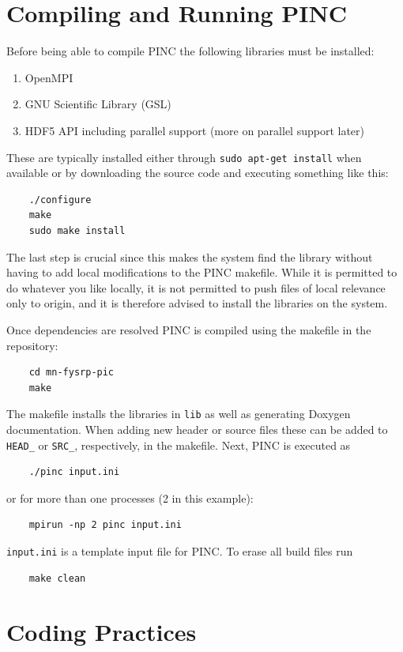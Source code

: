 \documentclass[10pt,a4paper]{article}
\begin{document}
\section{Compiling and Running PINC}\label{sec:dependencies}
Before being able to compile PINC the following libraries must be installed:
\begin{enumerate}
	\item OpenMPI
	\item GNU Scientific Library (GSL)
	\item HDF5 API including parallel support (more on parallel support later)
\end{enumerate}
These are typically installed either through \verb$sudo apt-get install$ when available or by downloading the source code and executing something like this:

\begin{verbatim}
	./configure
	make
	sudo make install
\end{verbatim}
The last step is crucial since this makes the system find the library without having to add local modifications to the PINC makefile. While it is permitted to do whatever you like locally, it is not permitted to push files of local relevance only to origin, and it is therefore advised to install the libraries on the system.

Once dependencies are resolved PINC is compiled using the makefile in the repository:

\begin{verbatim}
	cd mn-fysrp-pic
	make
\end{verbatim}
The makefile installs the libraries in \verb$lib$ as well as generating Doxygen documentation. When adding new header or source files these can be added to \verb$HEAD_$ or \verb$SRC_$, respectively, in the makefile. Next, PINC is executed as

\begin{verbatim}
	./pinc input.ini
\end{verbatim}
or for more than one processes (2 in this example):

\begin{verbatim}
	mpirun -np 2 pinc input.ini
\end{verbatim}
\verb$input.ini$ is a template input file for PINC. To erase all build files run

\begin{verbatim}
	make clean
\end{verbatim}

\section{Coding Practices}
\end{document}
